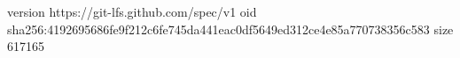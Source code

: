 version https://git-lfs.github.com/spec/v1
oid sha256:4192695686fe9f212c6fe745da441eac0df5649ed312ce4e85a770738356c583
size 617165
